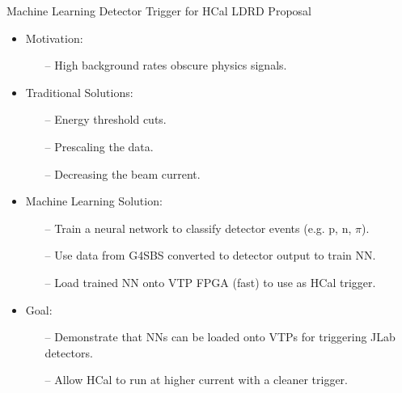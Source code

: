 \documentclass[10pt]{beamer}
\begin{document}
\begin{frame}{Machine Learning Detector Trigger for HCal LDRD Proposal}

	\begin{itemize}
		\item \alert{Motivation:}
			\begin{itemize}
				\item[--] High background rates obscure physics signals.
			\end{itemize}
		\item \alert{Traditional Solutions:}
			\begin{itemize}
				\item[--] Energy threshold cuts.
				\item[--] Prescaling the data.
				\item[--] Decreasing the beam current.
			\end{itemize}
		\item \alert{Machine Learning Solution:}
			\begin{itemize}
				\item[--] Train a neural network to classify detector events (e.g. p, n, $\pi$).
				\item[--] Use data from G4SBS converted to detector output to train NN.
				\item[--] Load trained NN onto VTP FPGA (fast) to use as HCal trigger.
			\end{itemize}
		\item \alert{Goal:}
			\begin{itemize}
				\item[--] Demonstrate that NNs can be loaded onto VTPs for triggering JLab detectors.
				\item[--] Allow HCal to run at higher current with a cleaner trigger.
			\end{itemize}
	\end{itemize}

\end{frame}
\end{document}
